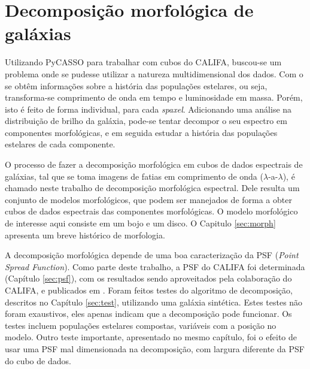 
\section{Decomposição morfológica de galáxias}

Utilizando PyCASSO para trabalhar com cubos do CALIFA, buscou-se um problema
onde se pudesse utilizar a natureza multidimensional dos dados. Com o \starlight
se obtêm informações sobre a história das populações estelares, ou seja,
transforma-se comprimento de onda em tempo e luminosidade em massa. Porém, isto
é feito de forma individual, para cada {\em spaxel}. Adicionando uma análise na
distribuição de brilho da galáxia, pode-se tentar decompor o seu espectro em
componentes morfológicas, e em seguida estudar a história das populações
estelares de cada componente.

O processo de fazer a decomposição morfológica em cubos de dados espectrais de
galáxias, tal que se toma imagens de fatias em comprimento de onda
($\lambda$-a-$\lambda$), é chamado neste trabalho de decomposição morfológica
espectral. Dele resulta um conjunto de modelos morfológicos, que podem ser
manejados de forma a obter cubos de dados espectrais das componentes
morfológicas. O modelo morfológico de interesse aqui consiste em um bojo e um
disco. O Capitulo \ref{sec:morph} apresenta um breve histórico de morfologia.


A decomposição morfológica depende de uma boa caracterização da PSF ({\em Point
Spread Function}). Como parte deste trabalho, a PSF do CALIFA foi determinada
(Capítulo \ref{sec:psf}), com os resultados sendo aproveitados pela colaboração
do CALIFA, e publicados em \citet{GarciaBenito2015}. Foram feitos testes do
algoritmo de decomposição, descritos no Capítulo \ref{sec:test}, utilizando uma
galáxia sintética. Estes testes não foram exaustivos, eles apenas indicam que a
decomposição pode funcionar. Os testes incluem populações estelares compostas,
variáveis com a posição no modelo. Outro teste importante, apresentado no mesmo
capítulo, foi o efeito de usar uma PSF mal dimensionada na decomposição, com
largura diferente da PSF do cubo de dados.

